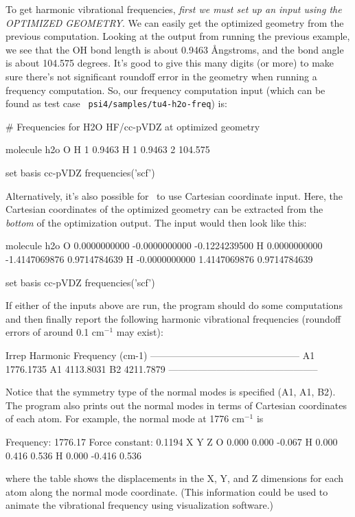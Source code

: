 To get harmonic vibrational frequencies, {\em first we must set up an input
using the OPTIMIZED GEOMETRY}.  We can easily get the optimized geometry
from the previous computation.  Looking at the output from running the
previous example, we see that the OH bond length is about 0.9463 {\AA}ngstroms,
and the bond angle is about 104.575 degrees.  It's good to give this many
digits (or more) to make sure there's not significant roundoff error in the
geometry when running a frequency computation.  So, our frequency
computation input (which can be found as test case {\tt
psi4/samples/tu4-h2o-freq}) is:
\begin{Snippet}
# Frequencies for H2O HF/cc-pVDZ at optimized geometry

molecule h2o {
  O
  H 1 0.9463
  H 1 0.9463 2 104.575
}

set basis cc-pVDZ
frequencies('scf')
\end{Snippet}
Alternatively, it's also possible for \PSIfour\ to use Cartesian coordinate
input.  Here, the Cartesian coordinates of the optimized geometry can be
extracted from the {\em bottom} of the optimization output.  The input 
would then look like
this:
\begin{Snippet}
molecule h2o {
  O     0.0000000000  -0.0000000000  -0.1224239500
  H     0.0000000000  -1.4147069876   0.9714784639
  H    -0.0000000000   1.4147069876   0.9714784639
}

set basis cc-pVDZ
frequencies('scf')
\end{Snippet}
If either of the inputs above are run, the program should do some
computations and then finally report the following harmonic vibrational
frequencies (roundoff errors of around 0.1 cm$^{-1}$ may exist):
\begin{Snippet}
          Irrep      Harmonic Frequency
                          (cm-1)
        -----------------------------------------------
             A1         1776.1735
             A1         4113.8031
             B2         4211.7879
        -----------------------------------------------
\end{Snippet}
Notice that the symmetry type of the normal modes is specified (A1, A1,
B2).  The program also prints out the normal modes in terms of Cartesian
coordinates of each atom.  For example, the normal mode at 1776 cm$^{-1}$
is
\begin{Snippet}
   Frequency:       1776.17
   Force constant:   0.1194
             X       Y       Z
  O        0.000   0.000  -0.067
  H        0.000   0.416   0.536
  H        0.000  -0.416   0.536
\end{Snippet}
where the table shows the displacements in the X, Y, and Z dimensions for
each atom along the normal mode coordinate.  (This information could be used
to animate the vibrational frequency using visualization software.)


